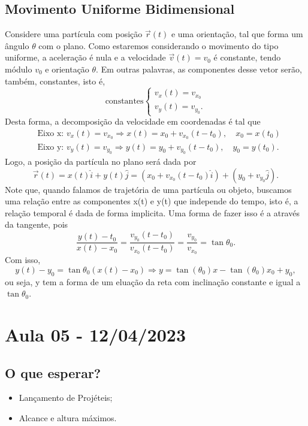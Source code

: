 \documentclass{article}
\begin{document}
\subsection{Movimento Uniforme Bidimensional}
    Considere uma part\'icula com posi\c c\~ao $\vec{r}(t)$ e uma orienta\c c\~ao, tal que forma um \^angulo $\theta$ com o plano. Como
  estaremos considerando o movimento do tipo uniforme, a acelera\c c\~ao \'e nula e a velocidade $\vec{v}(t) = v_{0}$ \'e constante,
  tendo m\'odulo $v_{0}$ e orienta\c c\~ao $\theta$. Em outras palavras, as componentes desse vetor ser\~ao, tamb\'em, constantes, isto \'e, 
    $$
    \text{constantes}\left\{\begin{array}{ll}
          v_{x}(t) = v_{x_{0}}\\
          v_{y}(t) = v_{y_{0}}.
        \end{array}\right.
    $$
    Desta forma, a decomposi\c c\~ao da velocidade em coordenadas \'e tal que 
   \begin{align*}
     &\text{Eixo x: }v_{x}(t) = v_{x_{0}} \Rightarrow x(t) = x_{0} + v_{x_{0}}(t-t_{0}),\quad x_{0} = x(t_{0})\\
     &\text{Eixo y: }v_{y}(t) = v_{y_{0}} \Rightarrow y(t) = y_{0} + v_{y_{0}}(t-t_{0}),\quad y_{0} = y(t_{0}).
   \end{align*}
   Logo, a posi\c c\~ao da part\'icula no plano ser\'a dada por 
     $$
     \vec{r}(t) = x(t)\hat{i} + y(t)\hat{j} = (x_{0} + v_{x_{0}}(t-t_{0})\hat{i}) + (y_{0} + v_{y_{0}}\hat{j}).
     $$
  Note que, quando falamos de trajet\'oria de uma part\'icula ou objeto, buscamos uma rela\c c\~ao entre as componentes x(t) e y(t) que
independe do tempo, isto \'e, a rela\c c\~ao temporal \'e dada de forma implicita. Uma forma de fazer isso \'e a atrav\'es da tangente, pois 
  $$
  \frac{y(t) - t_{0}}{x(t) - x_{0}} = \frac{v_{y_{0}}(t-t_{0})}{v_{x_{0}}(t-t_{0})} = \frac{v_{y_{0}}}{v_{x_{0}}} = \tan{\theta_{0}}.
  $$
  Com isso, 
    $$
    y(t) - y_{0} = \tan{\theta_{0}}(x(t)-x_{0}) \Rightarrow y = \tan{(\theta_{0})}x - \tan{(\theta_{0})}x_{0} + y_{0},
    $$
    ou seja, y tem a forma de um elua\c c\~ao da reta com inclina\c c\~ao constante e igual a $\tan{\theta_{0}}.$
\newpage

\section{Aula 05 - 12/04/2023}
\subsection{O que esperar?}
\begin{itemize}
  \item Lançamento de Projéteis;
  \item Alcance e altura máximos.
\end{itemize}
\end{document}
